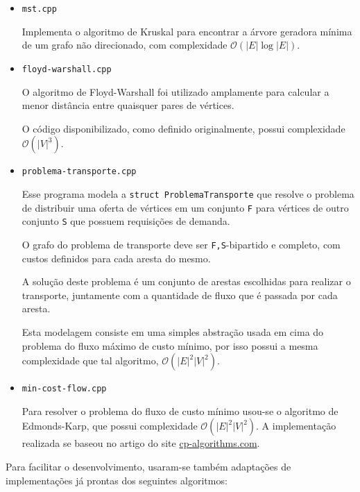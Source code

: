 \begin{itemize}
    \item \texttt{mst.cpp}

        Implementa o algoritmo de Kruskal para encontrar a árvore geradora mínima de um grafo não direcionado, com complexidade $\mathcal{O}(|E|\log |E|)$.
        
    \item \texttt{floyd-warshall.cpp}

        O algoritmo de Floyd-Warshall foi utilizado amplamente para calcular a menor distância entre quaisquer pares de vértices.

        O código disponibilizado, como definido originalmente, possui complexidade $\mathcal{O}(|V|^3)$.

    \item \texttt{problema-transporte.cpp}

        Esse programa modela a \texttt{struct ProblemaTransporte} que resolve o problema de distribuir uma oferta de vértices em um conjunto  \texttt{F} para vértices de outro conjunto \texttt{S} que possuem requisições de demanda.

        O grafo do problema de transporte deve ser \texttt{F,S}-bipartido e completo, com custos definidos para cada aresta do mesmo.

        A solução deste problema é um conjunto de arestas escolhidas para realizar o transporte, juntamente com a quantidade de fluxo que é passada por cada aresta.

        Esta modelagem consiste em uma simples abstração usada em cima do problema do fluxo máximo de custo mínimo, por isso possui a mesma complexidade que tal algoritmo, $\mathcal{O}(|E|^2 |V|^2)$.
        
    \item \texttt{min-cost-flow.cpp}

        Para resolver o problema do fluxo de custo mínimo usou-se o algoritmo de Edmonds-Karp, que possui complexidade $\mathcal{O}(|E|^2 |V|^2 )$.
        A implementação realizada se baseou no artigo \cite{min-cost} do site \href{https://cp-algorithms.com/}{cp-algorithms.com}.
        
\end{itemize}

Para facilitar o desenvolvimento, usaram-se também adaptações de implementações já prontas dos seguintes algoritmos:

